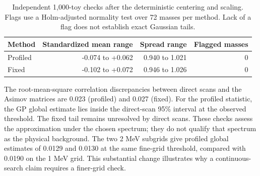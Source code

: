 \begin{table}[H]\centering\small
\begin{tabular}{lrrr}\toprule
Method & Standardized mean range & Spread range & Flagged masses\\\midrule
Profiled & -0.074 to +0.062 & 0.940 to 1.021 & 0 \\
Fixed & -0.102 to +0.072 & 0.946 to 1.026 & 0 \\
\bottomrule\end{tabular}
\caption{Independent 1,000-toy checks after the deterministic centering and scaling. Flags use a Holm-adjusted normality test over 72 masses per method. Lack of a flag does not establish exact Gaussian tails.}\end{table}

The root-mean-square correlation discrepancies between direct scans and the Asimov matrices are 0.023 (profiled) and 0.027 (fixed). For the profiled statistic, the GP global estimate lies inside the direct-scan 95\% interval at the observed threshold. The fixed tail remains unresolved by direct scans. These checks assess the approximation under the chosen spectrum; they do not qualify that spectrum as the physical background.
The two 2 MeV subgrids give profiled global estimates of 0.0129 and 0.0130 at the same fine-grid threshold, compared with 0.0190 on the 1 MeV grid. This substantial change illustrates why a continuous-search claim requires a finer-grid check.
